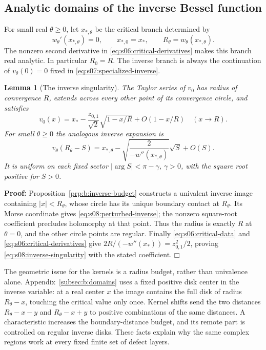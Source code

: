\documentclass[a4paper,10pt]{article}
\numberwithin{equation}{section}
\theoremstyle{paperplain}
\newtheorem{lmm}[thm]{Lemma}
\theoremstyle{paperremark}
\theoremstyle{paperplain}
\newenvironment{prf}{\noindent \textbf{Proof: }}{\hfill $\mdlgwhtsquare$\par\addvspace{0.5\baselineskip}}
\begin{document}
\subsection{Analytic domains of the inverse Bessel function}
\label{subsec:s08:01}

For small real $\theta\geq0$, let $x_{*,\theta}$ be the critical
branch determined by
\begin{equation}\label{eq:s08:critical-data}
 w_\theta'(x_{*,\theta})=0,\qquad x_{*,0}=x_*,\qquad
 R_\theta=w_\theta(x_{*,\theta}).
\end{equation}
The nonzero second derivative in
\eqref{eq:s06:critical-derivatives} makes this branch real analytic.
In particular $R_0=R$. The inverse branch is always the continuation
of $v_\theta(0)=0$ fixed in \eqref{eq:s07:specialized-inverse}.

\begin{lmm}[The inverse singularity]\label{lmm:s08:inverse}
The Taylor series of $v_0$ has radius of convergence $R$, extends
across every other point of its convergence circle, and satisfies
\begin{equation}\label{eq:s08:inverse-singularity}
 v_0(x)=x_*-\frac{z_{0,1}}{\sqrt2}\sqrt{1-x/R}+O(1-x/R)
                                      \quad(x\longrightarrow R).
\end{equation}
For small $\theta\geq0$ the analogous inverse expansion is
\begin{equation}\label{eq:s08:perturbed-inverse}
 v_\theta(R_\theta-S)
 =x_{*,\theta}-\sqrt{\frac{2}{-w''(x_{*,\theta})}}\sqrt S+O(S).
\end{equation}
It is uniform on each fixed sector $|\arg S|<\pi-\gamma$,
$\gamma>0$, with the square root positive for $S>0$.
\end{lmm}
\begin{prf}
Proposition~\ref{prp:b:inverse-budget} constructs a univalent inverse
image containing $|x|<R_\theta$, whose circle has its unique boundary
contact at $R_\theta$. Its Morse coordinate gives
\eqref{eq:s08:perturbed-inverse}; the nonzero square-root coefficient
precludes holomorphy at that point. Thus the radius is exactly $R$
at $\theta=0$, and the other circle points are regular.
Finally \eqref{eq:s06:critical-data} and
\eqref{eq:s06:critical-derivatives} give
$2R/(-w''(x_*))=z_{0,1}^2/2$, proving
\eqref{eq:s08:inverse-singularity} with the stated coefficient.
\end{prf}

The geometric issue for the kernels is a radius budget, rather than
univalence alone. Appendix~\ref{subsec:b:domains} uses a fixed
positive disk center in the inverse variable: at a real center $x$
the image contains the full disk of radius $R_\theta-x$, touching
the critical value only once. Kernel shifts send the two distances
$R_\theta-x-y$ and $R_\theta-x+y$ to positive combinations of
the same distances. A characteristic increases the boundary-distance
budget, and its remote part is controlled on regular inverse disks.
These facts explain why the same complex regions work at every
fixed finite set of defect layers.
\end{document}
